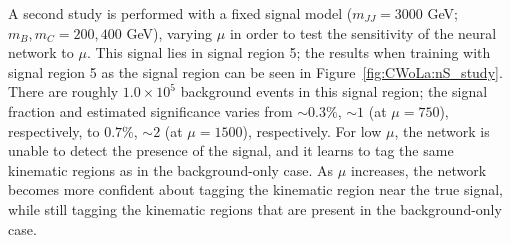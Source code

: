 

A second study is performed with a fixed signal model ($m_{JJ} = 3000$ GeV; $m_B,m_C = 200,400$ GeV), varying $\mu$ in order to test the sensitivity of the neural network to $\mu$.
This signal lies in signal region 5; the results when training with signal region 5 as the signal region can be seen in Figure~\ref{fig:CWoLa:nS_study}.
There are roughly $1.0\times10^5$ background events in this signal region; the signal fraction and estimated significance varies from $\sim 0.3\%$, $\sim 1$ (at $\mu=750$), respectively, to $0.7\%$, $\sim 2$ (at $\mu=1500$), respectively.
For low $\mu$, the network is unable to detect the presence of the signal, and it learns to tag the same kinematic regions as in the background-only case.
As $\mu$ increases, the network becomes more confident about tagging the kinematic region near the true signal, while still tagging the kinematic regions that are present in the background-only case.

